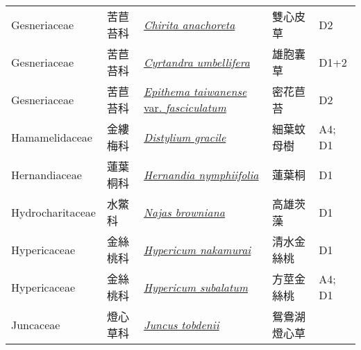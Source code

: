 {\begin{longtable}{L{2.5cm}L{2cm}L{5cm}L{2.5cm}L{3cm}}
    Gesneriaceae & 苦苣苔科 & \href{http://www.theplantlist.org/tpl1.1/search?q=Chirita+anachoreta}{\textit{Chirita anachoreta} } & 雙心皮草 & D2    \\
    Gesneriaceae & 苦苣苔科 & \href{http://www.theplantlist.org/tpl1.1/search?q=Cyrtandra+umbellifera}{\textit{Cyrtandra umbellifera} } & 雄胞囊草 & D1+2    \\
    Gesneriaceae & 苦苣苔科 & \href{http://www.theplantlist.org/tpl1.1/search?q=Epithema+taiwanense+var.+fasciculatum}{\textit{Epithema taiwanense} var. \textit{fasciculatum} } & 密花苣苔 & D2    \\
    Hamamelidaceae & 金縷梅科 & \href{http://www.theplantlist.org/tpl1.1/search?q=Distylium+gracile}{\textit{Distylium gracile} } & 細葉蚊母樹 & A4; D1    \\
    Hernandiaceae & 蓮葉桐科 & \href{http://www.theplantlist.org/tpl1.1/search?q=Hernandia+nymphiifolia}{\textit{Hernandia nymphiifolia} } & 蓮葉桐 & D1    \\
    Hydrocharitaceae & 水鱉科 & \href{http://www.theplantlist.org/tpl1.1/search?q=Najas+browniana}{\textit{Najas browniana} } & 高雄茨藻 & D1    \\
    Hypericaceae & 金絲桃科 & \href{http://www.theplantlist.org/tpl1.1/search?q=Hypericum+nakamurai}{\textit{Hypericum nakamurai} } & 清水金絲桃 & D1    \\
    Hypericaceae & 金絲桃科 & \href{http://www.theplantlist.org/tpl1.1/search?q=Hypericum+subalatum}{\textit{Hypericum subalatum} } & 方莖金絲桃 & A4; D1    \\
    Juncaceae & 燈心草科 & \href{http://www.theplantlist.org/tpl1.1/search?q=Juncus+tobdenii}{\textit{Juncus tobdenii} } & 鴛鴦湖燈心草 &     \\

\end{longtable}}

